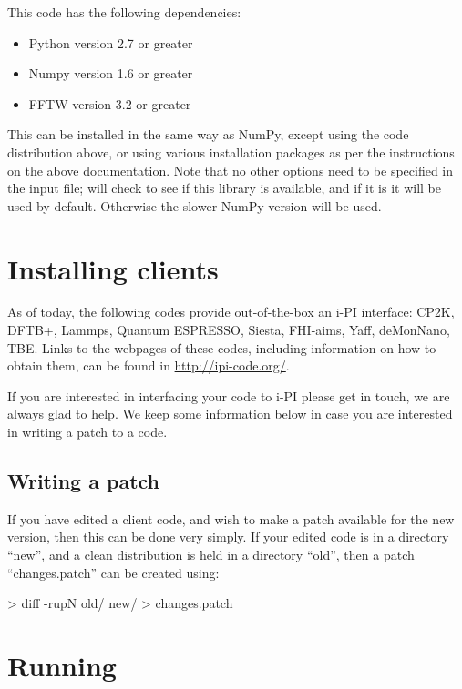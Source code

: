 \documentclass[11pt,english,fleqn]{report}
\newenvironment{code}{%
\footnotesize
\verbatim
}{
\endverbatim
\normalsize
}
\begin{document}
This code has the following dependencies:
\begin{itemize}
\item Python version 2.7 or greater
\item Numpy version 1.6 or greater
\item FFTW version 3.2 or greater
\end{itemize}
This can be installed in the same way as NumPy, except using the code
distribution above, or using various installation packages as per
the instructions on the above documentation. Note that no other options
need to be specified in the input file; \ipi will check to
see if this library is available, and if it is it will be used by
default. Otherwise the slower NumPy version will be used.


\section{Installing clients}

\label{clientinstall}

As of today, the following codes provide out-of-the-box an i-PI interface: CP2K, DFTB+, Lammps, Quantum ESPRESSO, Siesta, FHI-aims, Yaff, deMonNano, TBE.
Links to the webpages of these codes, including information on how to obtain them, can be found in \url{http://ipi-code.org/}.

If you are interested in interfacing your code to i-PI please get in touch, we are always glad to help.
We keep some information below in case you are interested in writing a patch to a code.

\subsection{Writing a patch}

If you have edited a client code, and wish to make a patch available
for the new version, then this can be done very simply.
If your edited code is in a directory {}``new'', and a clean
distribution is held in a directory {}``old'', then a patch
{}``changes.patch'' can be created using:

\begin{code}
> diff -rupN old/ new/ > changes.patch
\end{code}

\section{Running \ipi}
\end{document}

